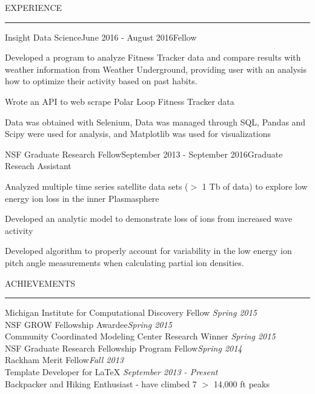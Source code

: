 \documentclass{cv} %
\renewenvironment{rSection}[1]{
\sectionskip
\textcolor{RoyalPurple}{\MakeUppercase{#1}}
\sectionlineskip
\hrule
\begin{list}{}{
\setlength{\leftmargin}{1.5em}
}
\item[]
}{
\end{list}
}
\begin{document}
\begin{rSection}{Experience}

  \begin{rSubsection}{Insight Data Science}{June 2016 - August 2016}{Fellow}{}
    \item Developed a program to analyze Fitness Tracker data and compare results with weather information from Weather Underground, providing user with an analysis how to optimize their activity based on past habits.
    \item Wrote an API to web scrape Polar Loop Fitness Tracker data
    \item Data was obtained with Selenium, Data was managed through SQL, Pandas and Scipy were used for analysis, and Matplotlib was used for visualizations
  \end{rSubsection}



  \begin{rSubsection}{NSF Graduate Research Fellow}{September 2013 - September 2016}{Graduate Reseach Assistant }{}
    \item Analyzed multiple time series satellite data sets ($>$ 1 Tb of data) to explore low energy ion loss in the inner Plasmasphere
    \item Developed an analytic model to demonstrate loss of ions from increased wave activity
    \item Developed algorithm to properly account for variability in the low energy ion pitch angle measurements when calculating partial ion densities.
  \end{rSubsection}

\end{rSection}



\begin{rSection}{Achievements} \itemsep -2pt
  {Michigan Institute for Computational Discovery Fellow }\hfill {\em Spring 2015} \\
  {NSF GROW Fellowship Awardee}\hfill {\em Spring 2015} \\
  {Community Coordinated Modeling Center Research Winner} \hfill {\em Spring 2015} \\
  {NSF Graduate Research Fellowship Program Fellow}\hfill {\em Spring 2014}\\
  {Rackham Merit Fellow}\hfill {\em Fall 2013}\\
  {Template Developer for LaTeX} \hfill {\em September 2013 - Present} \\
  {Backpacker and Hiking Enthusiast - have climbed 7 $>$ 14,000 ft peaks}
\end{rSection}
\end{document}

